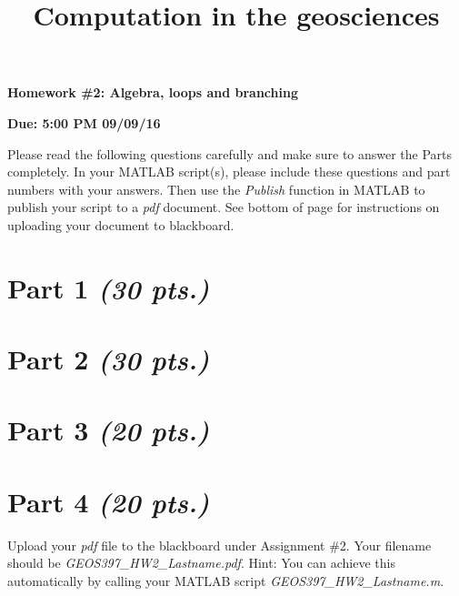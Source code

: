 \documentclass[10pt]{article}
\title{Computation in the geosciences}
\date{\empty}
\begin{document}
\begin{multicols}{2}
\begin{flushleft}
\textbf{Homework \#2: Algebra, loops and branching}
\end{flushleft}
\columnbreak 
\begin{flushright}
\textbf{Due: 5:00 PM 09/09/16}
\end{flushright}
\end{multicols}

Please read the following questions carefully and make sure to answer the Parts completely. In your MATLAB script(s), please include these questions and part numbers with your answers. Then use the \textit{Publish} function in MATLAB to publish your script to a \textit{pdf} document. See bottom of page for instructions on uploading your document to blackboard.

\section*{Part 1 \textit{(30 pts.)}}


\section*{Part 2 \textit{(30 pts.)}}



\section*{Part 3 \textit{(20 pts.)}}


\section*{Part 4 \textit{(20 pts.)}}


\vfill

Upload your \textit{pdf} file to the blackboard under Assignment \#2. Your filename should be \textit{GEOS397\_HW2\_Lastname.pdf}. Hint: You can achieve this automatically by calling your MATLAB script \textit{GEOS397\_HW2\_Lastname.m}.
\end{document}
